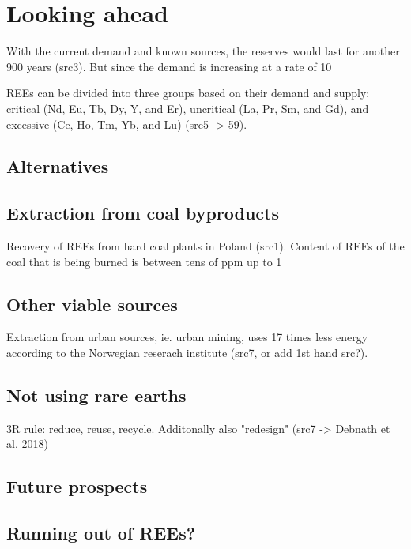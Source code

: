 
\section{Looking ahead}

With the current demand and known sources, the reserves would last for another 900 years (src3). But since the demand is increasing at a rate of 10%

REEs can be divided into three groups based on their demand and supply: critical (Nd, Eu,
Tb, Dy, Y, and Er), uncritical (La, Pr, Sm, and Gd), and excessive (Ce, Ho, Tm, Yb, and Lu) (src5 -> 59).

\subsection{Alternatives}

\subsection{Extraction from coal byproducts}

Recovery of REEs from hard coal plants in Poland (src1). Content of REEs of the coal that is being burned is between tens of ppm up to 1%

\subsection{Other viable sources}

Extraction from urban sources, ie. urban mining, uses 17 times less energy according to the Norwegian reserach institute (src7, or add 1st hand src?).

\subsection{Not using rare earths}

3R rule: reduce, reuse, recycle. Additonally also "redesign" (src7 -> Debnath et al. 2018)

\subsection{Future prospects}

\subsection{Running out of REEs?}

